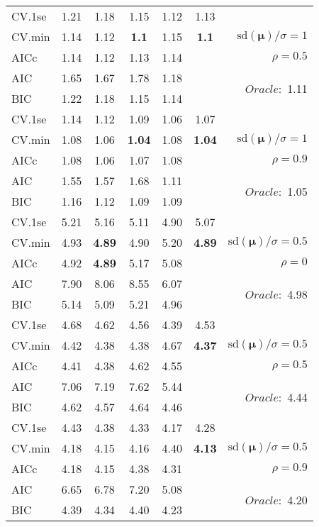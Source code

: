 \begin{table}
\begin{center}
\begin{tabular}{l*{5}{c}|r}
 \hline 
CV.1se & 1.21 & 1.18 & 1.15 & 1.12 & 1.13 & \\
CV.min & 1.14 & 1.12 & {\bf 1.1} & 1.15 & {\bf 1.1} &  $\mathrm{sd}(\mathbf{\mu})/\sigma=1$ \\
AICc & 1.14 & 1.12 & 1.13 & 1.14 & & $\rho=0.5$ \\
AIC & 1.65 & 1.67 & 1.78 & 1.18 & &  \multirow{2}{*}{$Oracle: $ 1.11} \\
BIC & 1.22 & 1.18 & 1.15 & 1.14 & &  \\
 \hline 
CV.1se & 1.14 & 1.12 & 1.09 & 1.06 & 1.07 & \\
CV.min & 1.08 & 1.06 & {\bf 1.04} & 1.08 & {\bf 1.04} &  $\mathrm{sd}(\mathbf{\mu})/\sigma=1$ \\
AICc & 1.08 & 1.06 & 1.07 & 1.08 & & $\rho=0.9$ \\
AIC & 1.55 & 1.57 & 1.68 & 1.11 & &  \multirow{2}{*}{$Oracle: $ 1.05} \\
BIC & 1.16 & 1.12 & 1.09 & 1.09 & &  \\
 \hline 
CV.1se & 5.21 & 5.16 & 5.11 & 4.90 & 5.07 & \\
CV.min & 4.93 & {\bf 4.89} & 4.90 & 5.20 & {\bf 4.89} &  $\mathrm{sd}(\mathbf{\mu})/\sigma=0.5$ \\
AICc & 4.92 & {\bf 4.89} & 5.17 & 5.08 & & $\rho=0$ \\
AIC & 7.90 & 8.06 & 8.55 & 6.07 & &  \multirow{2}{*}{$Oracle: $ 4.98} \\
BIC & 5.14 & 5.09 & 5.21 & 4.96 & &  \\
 \hline 
CV.1se & 4.68 & 4.62 & 4.56 & 4.39 & 4.53 & \\
CV.min & 4.42 & 4.38 & 4.38 & 4.67 & {\bf 4.37} &  $\mathrm{sd}(\mathbf{\mu})/\sigma=0.5$ \\
AICc & 4.41 & 4.38 & 4.62 & 4.55 & & $\rho=0.5$ \\
AIC & 7.06 & 7.19 & 7.62 & 5.44 & &  \multirow{2}{*}{$Oracle: $ 4.44} \\
BIC & 4.62 & 4.57 & 4.64 & 4.46 & &  \\
 \hline 
CV.1se & 4.43 & 4.38 & 4.33 & 4.17 & 4.28 & \\
CV.min & 4.18 & 4.15 & 4.16 & 4.40 & {\bf 4.13} &  $\mathrm{sd}(\mathbf{\mu})/\sigma=0.5$ \\
AICc & 4.18 & 4.15 & 4.38 & 4.31 & & $\rho=0.9$ \\
AIC & 6.65 & 6.78 & 7.20 & 5.08 & &  \multirow{2}{*}{$Oracle: $ 4.20} \\
BIC & 4.39 & 4.34 & 4.40 & 4.23 & &  \\
 \hline 
\end{tabular}
\end{center}
\vspace{-1cm}
\end{table}




